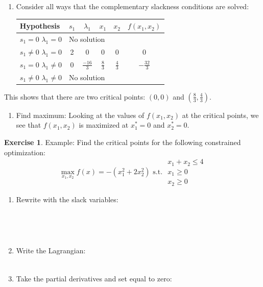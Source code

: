 \documentclass[
]{book}
\providecommand{\tightlist}{%
  \setlength{\itemsep}{0pt}\setlength{\parskip}{0pt}}
\theoremstyle{definition}
\theoremstyle{definition}
\theoremstyle{definition}
\newtheorem{exercise}{Exercise}[chapter]
\theoremstyle{definition}
\theoremstyle{remark}
\begin{document}
\begin{enumerate}
\def\labelenumi{\arabic{enumi}.}
\setcounter{enumi}{3}
\tightlist
\item
  Consider all ways that the complementary slackness conditions are solved:

  \begin{center}
  \begin{tabular}{|l|cccc|c|}
  \hline
  Hypothesis & $s_1$ & $\lambda_1$ & $x_1$ & $x_2$ & $f(x_1, x_2)$\\
  \hline
  $s_1 = 0$ $\lambda_1 = 0$ & \multicolumn{4}{l|}{No solution} & \\
  $s_1 \neq 0$ $\lambda_1 = 0$ & 2 & 0 & 0 & 0  & 0\\
  $s_1 = 0$ $\lambda_1 \neq 0$ & 0 & $\frac{-16}{3}$ & $\frac{8}{3}$ & $\frac{4}{3}$ & $-\frac{32}{3}$\\
  $s_1 \neq 0$ $\lambda_1 \neq 0$ & \multicolumn{4}{l|}{No solution} &\\
  \hline
  \end{tabular}
  \end{center}
\end{enumerate}

This shows that there are two critical points: \((0,0)\) and \((\frac{8}{3},\frac{4}{3})\).

\begin{enumerate}
\def\labelenumi{\arabic{enumi}.}
\setcounter{enumi}{4}
\tightlist
\item
  Find maximum:
  Looking at the values of \(f(x_1,x_2)\) at the critical points, we see that \(f(x_1,x_2)\) is maximized at \(x_1^* = 0\) and \(x_2^*=0\).
\end{enumerate}

\begin{exercise}
\protect\hypertarget{exr:unnamed-chunk-249}{}{\label{exr:unnamed-chunk-249} }Example: Find the critical points for the following constrained optimization:
\[\max_{x_1,x_2} f(x) = -(x_1^2 + 2x_2^2) \text{ s.t. } 
\begin{array}{l}
x_1 + x_2 \le 4\\
x_1 \ge 0\\
x_2 \ge 0
\end{array}\]
\end{exercise}

\begin{enumerate}
\def\labelenumi{\arabic{enumi}.}
\item
  Rewrite with the slack variables:
  \[\phantom{max_{x_1,x_2} f(x) = -(x_1^2 + 2x_2^2) \text{ s.t. } 
  \begin{array}{l}
  x_1 + x_2 \le 4 - s_1^2\\
  -x_1 \le 0 - s_2^2\\
  -x_2 \le 0 - s_3^2
  \end{array}}\]
\item
  Write the Lagrangian:
  \[\phantom{L(x_1, x_2, \lambda_1, \lambda_2, \lambda_3, s_1, s_2, s_3) =  -(x_1^2 + 2x_2^2) - \lambda_1(x_1 + x_2 + s_1^2  - 4) - \lambda_2(-x_1 + s_2^2) - \lambda_3(-x_2 + s_3^2)}\]
\item
  Take the partial derivatives and set equal to zero:
\end{enumerate}
\end{document}
